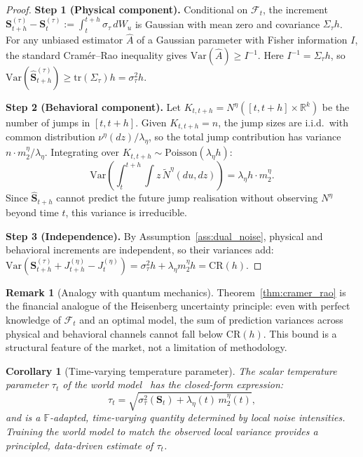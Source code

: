 \documentclass[12pt,a4paper]{article}
\theoremstyle{plain}
\newtheorem{corollary}[theorem]{Corollary}
\theoremstyle{definition}
\newtheorem{remark}[theorem]{Remark}
\newcommand{\R}{\mathbb{R}}
\newcommand{\F}{\mathcal{F}}
\newcommand{\tr}{\mathrm{tr}}
\newcommand{\Var}{\mathrm{Var}}
\newcommand{\1}{\mathbbm{1}}
\begin{document}
\begin{proof}
\textbf{Step 1 (Physical component).}
Conditional on $\F_t$, the increment $\mathbf{S}_{t+h}^{(\tau)} - \mathbf{S}_t^{(\tau)}
:= \int_t^{t+h}\sigma_\tau\,dW_u$ is Gaussian with mean zero and covariance
$\Sigma_\tau h$.  For any unbiased estimator $\hat{A}$ of a Gaussian parameter
with Fisher information $I$, the standard Cramér--Rao inequality gives
$\Var(\hat{A}) \geq I^{-1}$.  Here $I^{-1} = \Sigma_\tau h$, so
$\Var(\hat{\mathbf{S}}^{(\tau)}_{t+h}) \geq \tr(\Sigma_\tau)h = \sigma_\tau^2 h$.

\textbf{Step 2 (Behavioral component).}
Let $K_{t,t+h} = N^\eta([t,t+h]\times\R^k)$ be the number of jumps in
$[t,t+h]$. Given $K_{t,t+h} = n$, the jump sizes are i.i.d.\ with common
distribution $\nu^\eta(dz)/\lambda_\eta$, so the total jump contribution
has variance $n \cdot m_2^\eta / \lambda_\eta$.  Integrating over
$K_{t,t+h} \sim \mathrm{Poisson}(\lambda_\eta h)$:
\[
\Var\!\left(\int_t^{t+h}\!\!\int z\,\tilde{N}^\eta(du,dz)\right)
= \lambda_\eta h \cdot m_2^\eta.
\]
Since $\hat{\mathbf{S}}_{t+h}$ cannot predict the future jump realisation
without observing $N^\eta$ beyond time $t$, this variance is irreducible.

\textbf{Step 3 (Independence).}
By Assumption~\ref{ass:dual_noise}, physical and behavioral increments are
independent, so their variances add:
$\Var(\mathbf{S}_{t+h}^{(\tau)} + J_{t+h}^{(\eta)} - J_t^{(\eta)})
= \sigma_\tau^2 h + \lambda_\eta m_2^\eta h = \mathrm{CR}(h)$.
\end{proof}

\begin{remark}[Analogy with quantum mechanics]
Theorem~\ref{thm:cramer_rao} is the financial analogue of the Heisenberg
uncertainty principle: even with perfect knowledge of $\F_t$ and an optimal
model, the sum of prediction variances across physical and behavioral channels
cannot fall below $\mathrm{CR}(h)$.  This bound is a structural feature of
the market, not a limitation of methodology.
\end{remark}

\begin{corollary}[Time-varying temperature parameter]
The scalar temperature parameter $\tau_t$ of the world model~\citep{HaSchmidhuber2018}
has the closed-form expression:
\[
\tau_t = \sqrt{\sigma_\tau^2(\mathbf{S}_t) + \lambda_\eta(t)\,m_2^\eta(t)},
\]
and is a $\mathbb{F}$-adapted, time-varying quantity determined by local
noise intensities.  Training the world model to match the observed local
variance provides a principled, data-driven estimate of $\tau_t$.
\end{corollary}
\end{document}

